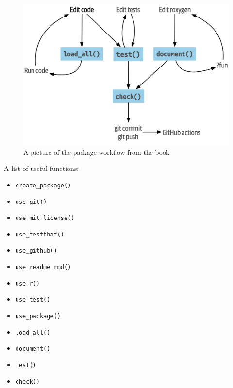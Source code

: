 \documentclass[12pt]{article}
\begin{document}
\begin{figure}
    \centering
    \includegraphics[width=0.8\linewidth]{workflow.png}
    \caption{A picture of the package workflow from the book}
\end{figure}

\pagebreak

A list of useful functions:
\begin{itemize}
    \item \verb|create_package()|
    \item \verb|use_git()|
    \item \verb|use_mit_license()|
    \item \verb|use_testthat()|
    \item \verb|use_github()|
    \item \verb|use_readme_rmd()|
    \item \verb|use_r()|
    \item \verb|use_test()|
    \item \verb|use_package()|
    \item \verb|load_all()|
    \item \verb|document()|
    \item \verb|test()|
    \item \verb|check()|
\end{itemize}
\end{document}
